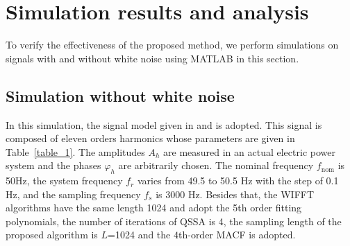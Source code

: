\documentclass[journal,twoside]{IEEEtran}
\begin{document}








\section{Simulation results and analysis}
To verify the effectiveness of the proposed method, we perform simulations on signals with and without white noise using MATLAB in this section.
\subsection{Simulation without white noise}
In this simulation, the signal model given in \cite{Wen2014} and \cite{Zhang2001} is adopted. This signal is composed of eleven orders harmonics whose parameters are given in Table~\ref{table_1}. The amplitudes $A_h$ are measured in an actual electric power system and the phases $\varphi_h$ are arbitrarily chosen. The nominal frequency $f_\mathrm{nom}$ is 50Hz, the system frequency $f_r$ varies from 49.5 to 50.5 Hz with the step of 0.1 Hz, and the sampling frequency $f_s$ is 3000 Hz. Besides that, the WIFFT algorithms have the same length 1024 and adopt the 5th order fitting polynomials, the number of iterations of QSSA is 4, the sampling length of the proposed algorithm is $L$=1024 and the $4$th-order MACF is adopted.
\end{document}
